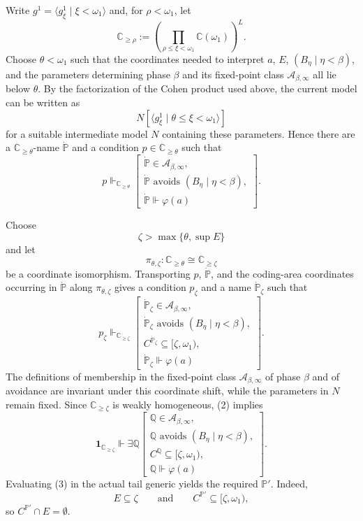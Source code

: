 \documentclass[a4paper,11pt]{article}
\newcommand{\forceP}{\mathbb{P}}
\newcommand{\forceQ}{\mathbb{Q}}
\begin{document}
Write $g^1=\langle g^1_\xi\mid\xi<\omega_1\rangle$ and, for $\rho<\omega_1$, let
\[
\mathbb C_{\geq\rho}
:=
\left(\prod_{\rho\leq\xi<\omega_1}\mathbb C(\omega_1)\right)^L.
\]
Choose $\theta<\omega_1$ such that the coordinates needed to interpret $a$, $E$, $(B_\eta\mid\eta<\beta)$, and the parameters determining phase $\beta$ and its fixed-point class $\mathcal A_{\beta,\infty}$ all lie below $\theta$. By the factorization of the Cohen product used above, the current model can be written as
\[
N[\langle g^1_\xi\mid\theta\leq\xi<\omega_1\rangle]
\]
for a suitable intermediate model $N$ containing these parameters. Hence there are a $\mathbb C_{\geq\theta}$-name $\dot{\forceP}$ and a condition $p\in\mathbb C_{\geq\theta}$ such that
\begin{equation*}
\tag{1}
p\Vdash_{\mathbb C_{\geq\theta}}
\left[
\begin{array}{l}
\dot{\forceP}\in\mathcal A_{\beta,\infty},\\[1mm]
\dot{\forceP}\text{ avoids }(B_\eta\mid\eta<\beta),\\[1mm]
\dot{\forceP}\Vdash\varphi(a)
\end{array}
\right].
\end{equation*}

Choose
\[
\zeta>\max\{\theta,\sup E\}
\]
and let
\[
\pi_{\theta,\zeta}:\mathbb C_{\geq\theta}\cong\mathbb C_{\geq\zeta}
\]
be a coordinate isomorphism. Transporting $p$, $\dot{\forceP}$, and the coding-area coordinates occurring in $\dot{\forceP}$ along $\pi_{\theta,\zeta}$ gives a condition $p_\zeta$ and a name $\dot{\forceP}_\zeta$ such that
\begin{equation*}
\tag{2}
p_\zeta\Vdash_{\mathbb C_{\geq\zeta}}
\left[
\begin{array}{l}
\dot{\forceP}_\zeta\in\mathcal A_{\beta,\infty},\\[1mm]
\dot{\forceP}_\zeta\text{ avoids }(B_\eta\mid\eta<\beta),\\[1mm]
C^{\dot{\forceP}_\zeta}\subseteq[\zeta,\omega_1),\\[1mm]
\dot{\forceP}_\zeta\Vdash\varphi(a)
\end{array}
\right].
\end{equation*}
The definitions of membership in the fixed-point class $\mathcal A_{\beta,\infty}$ of phase $\beta$ and of avoidance are invariant under this coordinate shift, while the parameters in $N$ remain fixed. Since $\mathbb C_{\geq\zeta}$ is weakly homogeneous, (2) implies
\begin{equation*}
\tag{3}
\mathbf 1_{\mathbb C_{\geq\zeta}}\Vdash
\exists\forceQ\left[
\begin{array}{l}
\forceQ\in\mathcal A_{\beta,\infty},\\[1mm]
\forceQ\text{ avoids }(B_\eta\mid\eta<\beta),\\[1mm]
C^{\forceQ}\subseteq[\zeta,\omega_1),\\[1mm]
\forceQ\Vdash\varphi(a)
\end{array}
\right].
\end{equation*}
Evaluating (3) in the actual tail generic yields the required $\forceP'$. Indeed,
\[
E\subseteq\zeta
\qquad\text{and}\qquad
C^{\forceP'}\subseteq[\zeta,\omega_1),
\]
so $C^{\forceP'}\cap E=\emptyset$.
\end{document}
